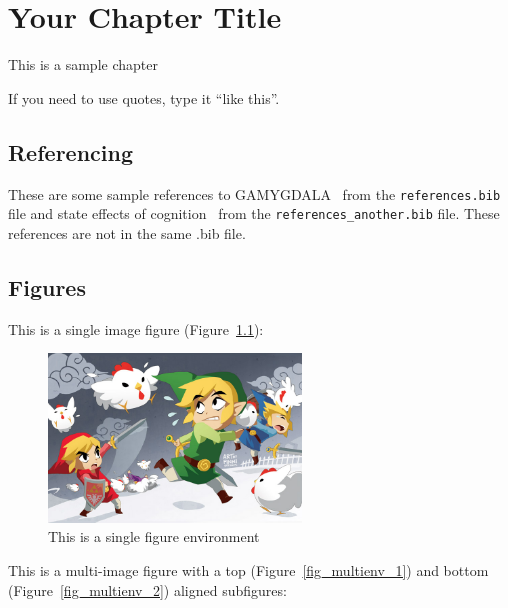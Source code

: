 \chapter{Your Chapter Title}

This is a sample chapter

If you need to use quotes, type it ``like this''.

\section{Referencing}
These are some sample references to GAMYGDALA~\citep{popescu2014gamygdala} from 
the \texttt{references.bib} file and state effects of 
cognition~\citep{hudlicka2002time} from the \texttt{references\_another.bib} 
file. These references are not in the same .bib file.

\section{Figures}
This is a single image figure (Figure~\ref{fig_singleenv}):

\begin{figure}[ht]
    \centering
    \includegraphics[width=0.6\textwidth]{figures/Sample/tumblr_static_eaceks0rfxsss8o4swscw40wo.jpg}
    \caption[Single Figure Environment Listed Title]{This is a single figure 
    environment}
    \label{fig_singleenv}
\end{figure}

This is a multi-image figure with a top (Figure~\ref{fig_multienv_1}) and bottom (Figure~\ref{fig_multienv_2}) aligned subfigures:

